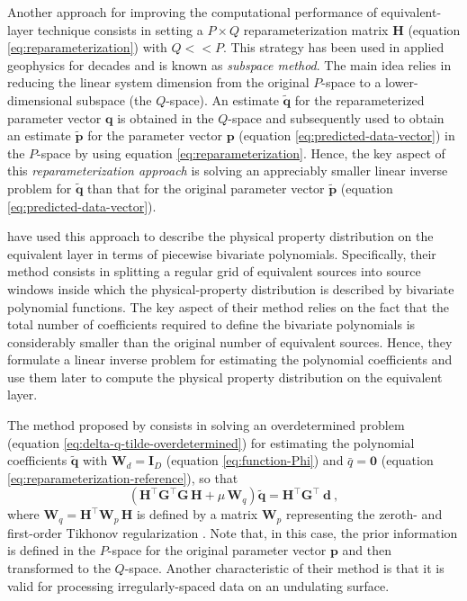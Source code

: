 Another approach for improving the computational performance of equivalent-layer technique consists in 
setting a $P \times Q$ reparameterization matrix $\mathbf{H}$ (equation \ref{eq:reparameterization})
with $Q << P$. 
This strategy has been used in applied geophysics for decades \cite[e.g.,][]{skilling-bryan1984, kennett1988, oldenburg1993, barbosa-etal1997} 
and is known as \textit{subspace method}. 
The main idea relies in reducing the linear system dimension from the original $P$-space to a lower-dimensional subspace (the $Q$-space).
An estimate $\tilde{\mathbf{q}}$ for the reparameterized parameter vector $\mathbf{q}$
is obtained in the $Q$-space and subsequently used to obtain an estimate $\tilde{\mathbf{p}}$ 
for the parameter vector $\mathbf{p}$ (equation \ref{eq:predicted-data-vector}) in the $P$-space by using equation
\ref{eq:reparameterization}. 
Hence, the key aspect of this \textit{reparameterization approach} is solving an appreciably smaller linear inverse problem for 
$\tilde{\mathbf{q}}$ than that for the original parameter vector $\tilde{\mathbf{p}}$ (equation \ref{eq:predicted-data-vector}).

\cite{oliveirajr-etal2013} have used this approach to describe the physical property distribution on the
equivalent layer in terms of piecewise bivariate polynomials.
Specifically, their method consists in splitting a regular grid of equivalent sources into 
source windows inside which the physical-property distribution is described by bivariate polynomial 
functions. The key aspect of their method relies on the fact that the total number of coefficients 
required to define the bivariate polynomials is considerably smaller than the original number of equivalent sources. 
Hence, they formulate a linear inverse problem for estimating the polynomial coefficients and use them later
to compute the physical property distribution on the equivalent layer. 

The method proposed by \cite{oliveirajr-etal2013} consists in solving an overdetermined problem 
(equation \ref{eq:delta-q-tilde-overdetermined}) for estimating the polynomial coefficients 
$\tilde{\mathbf{q}}$ with $\mathbf{W}_{d} = \mathbf{I}_{D}$ (equation \ref{eq:function-Phi}) and
$\bar{q} = \mathbf{0}$ (equation \ref{eq:reparameterization-reference}), so that
\begin{equation}
	\left( \mathbf{H}^{\top} \mathbf{G}^{\top} \mathbf{G} \, \mathbf{H} + 
	\mu \, \mathbf{W}_{q} \right) 
	\tilde{\mathbf{q}} = 
	\mathbf{H}^{\top} \mathbf{G}^{\top} \: \mathbf{d} \: ,
	\label{eq:q-tilde-OBU13}
\end{equation}
where $\mathbf{W}_{q} = \mathbf{H}^{\top}\mathbf{W}_{p} \, \mathbf{H}$ is defined by a matrix $\mathbf{W}_{p}$
representing the zeroth- and first-order Tikhonov regularization \cite[e.g.,][p. 103]{aster_etal2019}.
Note that, in this case, the prior information is defined in the $P$-space for the original parameter vector $\mathbf{p}$
and then transformed to the $Q$-space.
Another characteristic of their method is that it is valid for processing irregularly-spaced data
on an undulating surface.

